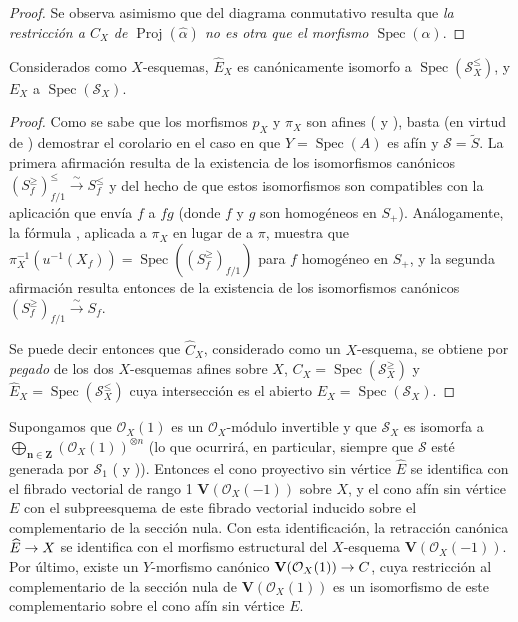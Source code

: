 \documentclass[oneside,10pt]{amsart}
\makeatletter
\renewcommand{\leq}{\leqslant}
\renewcommand{\geq}{\geqslant}
\newcommand{\ega@arrow}[2]{\mathchoice{#1}{#2}{#2}{#2}}
\renewcommand{\to}{\ega@arrow{\longrightarrow}{\rightarrow}}
\newcommand{\oldpage}[2][]{\marginnote{\normalfont\footnotesize\textbf{#1}~|~#2}\ignorespaces}
\let\EGAOriginalLabel\label
\renewcommand{\label}[1]{\phantomsection\EGAOriginalLabel{#1}}
\newcommand*{\ega@labelnumber}[1]{\StrBehind{#1}{.}}
\newcommand{\eref}[1]{\hyperref[#1]{\normalfont{(\ega@labelnumber{#1})}}}
\makeatother
\begin{document}
\begin{proof}
\oldpage[II]{173}
Se observa asimismo que del diagrama conmutativo \eref{II.8.5.3.2-fr} resulta que \emph{la restricción a $C_X$ de $\operatorname{Proj}(\widehat{\alpha})$ no es otra que el morfismo $\operatorname{Spec}(\alpha)$}.
\end{proof}
\begin{corollary}[8.6.3]
\label{II.8.6.3-fr}
Considerados como $X$-esquemas, $\widehat{E}_X$ es canónicamente isomorfo a $\operatorname{Spec}(\mathcal{S}_X^{\leq})$, y $E_X$ a $\operatorname{Spec}(\mathcal{S}_X)$.
\end{corollary}

\begin{proof}
Como se sabe que los morfismos $p_X$ y $\pi_X$ son afines ( y ), basta (en virtud de ) demostrar el corolario en el caso en que $Y=\operatorname{Spec}(A)$ es afín y $\mathcal{S}=\widetilde{S}$.
La primera afirmación resulta de la existencia de los isomorfismos canónicos  $(S_f^{\geq})_{f/1}^{\leq}\xrightarrow{\sim}S_f^{\leq}$ y del hecho de que estos isomorfismos son compatibles con la aplicación que envía $f$ a $fg$ (donde $f$ y $g$ son homogéneos en $S_+$).
Análogamente, la fórmula , aplicada a $\pi_X$ en lugar de a $\pi$, muestra que $\pi_X^{-1}(u^{-1}(X_f))=
\operatorname{Spec}((S_f^{\geq})_{f/1})$ para $f$ homogéneo en $S_+$, y la segunda afirmación resulta entonces de la existencia de los isomorfismos canónicos  $(S_f^{\geq})_{f/1}\xrightarrow{\sim}S_f$.

Se puede decir entonces que $\widehat{C}_X$, considerado como un $X$-esquema, se obtiene por \emph{pegado} de los dos $X$-esquemas afines sobre $X$, $C_X=\operatorname{Spec}(\mathcal{S}_X^{\geq})$ y $\widehat{E}_X=\operatorname{Spec}(\mathcal{S}_X^{\leq})$ cuya intersección es el abierto $E_X=\operatorname{Spec}(\mathcal{S}_X)$.
\end{proof}
\begin{corollary}[8.6.4]
\label{II.8.6.4-fr}
Supongamos que $\mathcal{O}_X(1)$ es un $\mathcal{O}_X$-módulo invertible y que $\mathcal{S}_X$ es isomorfa a $\bigoplus_{\boldsymbol{n}\in\mathbf{Z}}(\mathcal{O}_X(1))^{\otimes n}$ (lo que ocurrirá, en particular, siempre que $\mathcal{S}$ esté generada por $\mathcal{S}_1$ \textup{(} y \textup{))}.
Entonces el cono proyectivo sin vértice $\widehat{E}$ se identifica con el fibrado vectorial de rango 1 $\mathbf{V}(\mathcal{O}_X(-1))$ sobre $X$, y el cono afín sin vértice $E$ con el subpreesquema de este fibrado vectorial inducido sobre el complementario de la sección nula.
Con esta identificación, la retracción canónica $\widehat{E}\to X$ se identifica con el morfismo estructural del $X$-esquema $\mathbf{V}(\mathcal{O}_X(-1))$.
Por último, existe un $Y$-morfismo canónico $\mathbf{V}(\mathcal{O}_X(1))\to C$, cuya restricción al complementario de la sección nula de $\mathbf{V}(\mathcal{O}_X(1))$ es un isomorfismo de este complementario sobre el cono afín sin vértice $E$.
\end{corollary}
\end{document}
